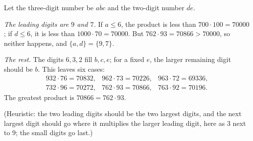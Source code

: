 Let the three-digit number be $\overline{abc}$ and the two-digit number $\overline{de}$.

\emph{The leading digits are $9$ and $7$.} If $a\le6$, the product is less than $700\cdot100=70000$; if $d\le6$, it is less than $1000\cdot70=70000$. But $762\cdot93=70866>70000$, so neither happens, and $\{a,d\}=\{9,7\}$.

\emph{The rest.} The digits $6,3,2$ fill $b,c,e$; for a fixed $e$, the larger remaining digit should be $b$. This leaves six cases:
\[
\begin{array}{lll}
932\cdot76=70832, & 962\cdot73=70226, & 963\cdot72=69336,\\
732\cdot96=70272, & 762\cdot93=70866, & 763\cdot92=70196 .
\end{array}
\]
The greatest product is $\boxed{70866}=762\cdot93$.

(Heuristic: the two leading digits should be the two largest digits, and the next largest digit should go where it multiplies the larger leading digit, here as $3$ next to $9$; the small digits go last.)
